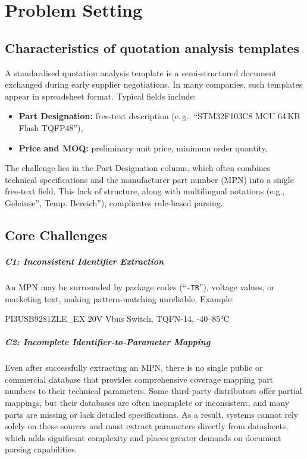 \chapter{Problem Setting}
\label{chapter:problem}

\section{Characteristics of quotation analysis templates}
A standardised quotation analysis template is a semi-structured document exchanged during early supplier negotiations.  
In many companies, such templates appear in spreadsheet format.  
Typical fields include:  

\begin{itemize}
  \item \textbf{Part Designation:} free-text description (e.\,g., ``STM32F103C8 MCU 64\,KB Flash TQFP48''),
  \item \textbf{Price and MOQ:} preliminary unit price, minimum order quantity,
\end{itemize}

The challenge lies in the Part Designation column, which often combines technical specifications and the manufacturer part number (MPN) into a single free-text field.
This lack of structure, along with multilingual notations (e.g., Gehäuse'', Temp. Bereich''), complicates rule-based parsing.

\section{Core Challenges}
\paragraph{C1: Inconsistent Identifier Extraction}  
An MPN may be surrounded by package codes (``\texttt{-TR}''), voltage values, or marketing text, making pattern-matching unreliable.  
Example:  
\begin{center}
\ttfamily PI3USB9281ZLE\_EX   20V Vbus Switch, TQFN-14, -40–85°C
\end{center}

\paragraph{C2: Incomplete Identifier-to-Parameter Mapping}
Even after successfully extracting an MPN, there is no single public or commercial database that provides comprehensive coverage mapping part numbers to their technical parameters. Some third-party distributors offer partial mappings, but their databases are often incomplete or inconsistent, and many parts are missing or lack detailed specifications. As a result, systems cannot rely solely on these sources and must extract parameters directly from datasheets, which adds significant complexity and places greater demands on document parsing capabilities.

